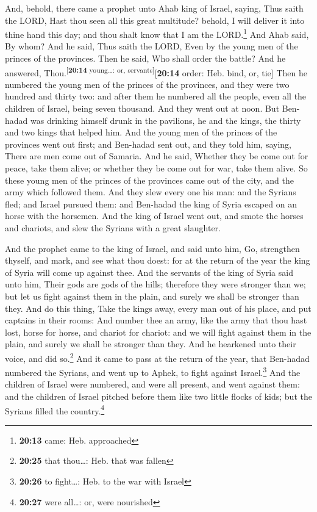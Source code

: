  And, behold, there came a prophet unto Ahab king of
Israel, saying, Thus saith the LORD, Hast thou seen all this great
multitude? behold, I will deliver it into thine hand this day; and thou
shalt know that I am the LORD.\footnote{\textbf{20:13} came: Heb.
  approached}  And Ahab said, By whom? And he said, Thus
saith the LORD, Even by the young men of the princes of the provinces.
Then he said, Who shall order the battle? And he answered,
Thou.\textsuperscript{{[}\textbf{20:14} young\ldots: or,
servants{]}}{[}\textbf{20:14} order: Heb. bind, or, tie{]}
 Then he numbered the young men of the princes of the
provinces, and they were two hundred and thirty two: and after them he
numbered all the people, even all the children of Israel, being seven
thousand.  And they went out at noon. But Ben-hadad was
drinking himself drunk in the pavilions, he and the kings, the thirty
and two kings that helped him.  And the young men of the
princes of the provinces went out first; and Ben-hadad sent out, and
they told him, saying, There are men come out of Samaria.
 And he said, Whether they be come out for peace, take
them alive; or whether they be come out for war, take them alive.
 So these young men of the princes of the provinces came
out of the city, and the army which followed them.  And
they slew every one his man: and the Syrians fled; and Israel pursued
them: and Ben-hadad the king of Syria escaped on an horse with the
horsemen.  And the king of Israel went out, and smote the
horses and chariots, and slew the Syrians with a great slaughter.

 And the prophet came to the king of Israel, and said
unto him, Go, strengthen thyself, and mark, and see what thou doest: for
at the return of the year the king of Syria will come up against thee.
 And the servants of the king of Syria said unto him,
Their gods are gods of the hills; therefore they were stronger than we;
but let us fight against them in the plain, and surely we shall be
stronger than they.  And do this thing, Take the kings
away, every man out of his place, and put captains in their rooms:
 And number thee an army, like the army that thou hast
lost, horse for horse, and chariot for chariot: and we will fight
against them in the plain, and surely we shall be stronger than they.
And he hearkened unto their voice, and did so.\footnote{\textbf{20:25}
  that thou\ldots: Heb. that was fallen}  And it came to
pass at the return of the year, that Ben-hadad numbered the Syrians, and
went up to Aphek, to fight against Israel.\footnote{\textbf{20:26} to
  fight\ldots: Heb. to the war with Israel}  And the
children of Israel were numbered, and were all present, and went against
them: and the children of Israel pitched before them like two little
flocks of kids; but the Syrians filled the country.\footnote{\textbf{20:27}
  were all\ldots: or, were nourished}

